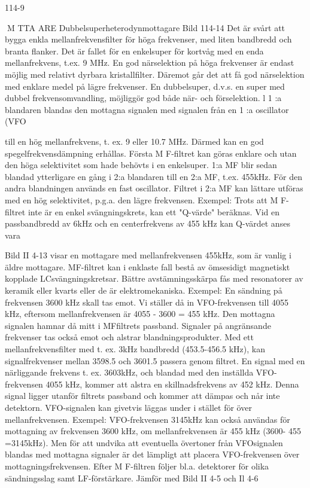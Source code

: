 \documentclass[a4paper,twoside,twocolumn,openright]{book}
\begin{document}
{{{{114-9

M TTA ARE
Dubbelsuperheterodynmottagare
Bild 114-14
Det är svårt att bygga enkla mellanfrekvensfilter för höga frekvenser, med liten bandbredd och branta flanker. Det är fallet för en
enkelsuper för kortvåg med en enda mellanfrekvens, t.ex. 9 MHz.
En god närselektion på höga frekvenser
är endast möjlig med relativt dyrbara kristallfilter. Däremot går det att få god närselektion
med enklare medel på lägre frekvenser.
En dubbelsuper, d.v.s. en super med
dubbel frekvensomvandling, möjliggör god
både när- och förselektion. l 1 :a blandaren
blandas den mottagna signalen med signalen från en 1 :a oscillator (VFO} till en hög
mellanfrekvens, t. ex. 9 eller 10.7 MHz.
Därmed kan en god spegelfrekvensdämpning erhållas. Första M F-filtret kan göras enklare och utan den höga selektivitet
som hade behövts i en enkelsuper. 1:a MF
blir sedan blandad ytterligare en gång i 2:a
blandaren till en 2:a MF, t.ex. 455kHz. För
den andra blandningen används en fast
oscillator. Filtret i 2:a MF kan lättare utföras
med en hög selektivitet, p.g.a. den lägre
frekvensen.
Exempel:
Trots att M F-filtret inte är en enkel
svängningskrets, kan ett "Q-värde" beräknas. Vid en passbandbredd av 6kHz och en
centerfrekvens av 455 kHz kan Q-värdet
anses vara

Bild II 4-13 visar en mottagare med mellanfrekvensen 455kHz, som är vanlig i äldre
mottagare. MF-filtret kan i enklaste fall bestå av ömsesidigt magnetiskt kopplade LCsvängningskretsar. Bättre avstämningsskärpa fås med resonatorer av keramik eller
kvarts eller de är elektromekaniska.
Exempel:
En sändning på frekvensen 3600 kHz
skall tas emot. Vi ställer då in VFO-frekvensen till 4055 kHz, eftersom mellanfrekvensen är 4055 - 3600 = 455 kHz. Den
mottagna signalen hamnar då mitt i MFfiltrets passband.
Signaler på angränsande frekvenser tas
också emot och alstrar blandningsprodukter.
Med ett mellanfrekvensfilter med t. ex. 3kHz
bandbredd (453.5-456.5 kHz), kan signalfrekvenser mellan 3598.5 och 3601.5 passera genom filtret. En signal med en närliggande frekvens t. ex. 3603kHz, och blandad
med den inställda VFO-frekvensen 4055
kHz, kommer att alstra en skillnadsfrekvens
av 452 kHz. Denna signal ligger utanför
filtrets passband och kommer att dämpas
och når inte detektorn.
VFO-signalen kan givetvis läggas under
i stället för över mellanfrekvensen.
Exempel: VFO-frekvensen 3145kHz kan
också användas för mottagning av frekvensen 3600 kHz, om mellanfrekvensen är 455
kHz (3600- 455 =3145kHz). Men för att
undvika att eventuella övertoner från VFOsignalen blandas med mottagna signaler är
det lämpligt att placera VFO-frekvensen över
mottagningsfrekvensen.
Efter M F-filtren följer bl.a. detektorer för
olika sändningsslag samt LF-förstärkare.
Jämför med Bild II 4-5 och Il 4-6

}}}
\end{document}
